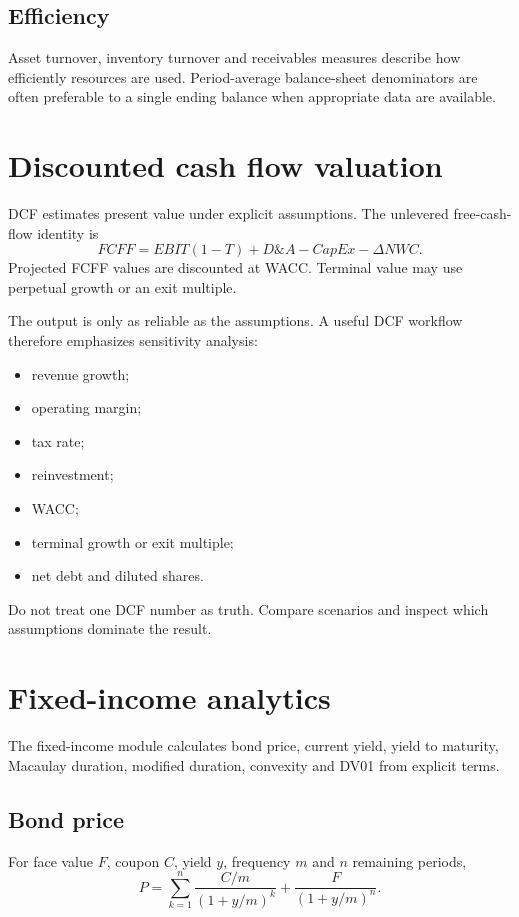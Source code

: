 \documentclass[11pt]{article}
\begin{document}
\subsection{Efficiency}
Asset turnover, inventory turnover and receivables measures describe how efficiently resources are used. Period-average balance-sheet denominators are often preferable to a single ending balance when appropriate data are available.

\section{Discounted cash flow valuation}
DCF estimates present value under explicit assumptions. The unlevered free-cash-flow identity is
\begin{equation}
FCFF=EBIT(1-T)+D\&A-CapEx-\Delta NWC.
\end{equation}
Projected FCFF values are discounted at WACC. Terminal value may use perpetual growth or an exit multiple.

The output is only as reliable as the assumptions. A useful DCF workflow therefore emphasizes sensitivity analysis:
\begin{itemize}[itemsep=0.15em]
\item revenue growth;
\item operating margin;
\item tax rate;
\item reinvestment;
\item WACC;
\item terminal growth or exit multiple;
\item net debt and diluted shares.
\end{itemize}

Do not treat one DCF number as truth. Compare scenarios and inspect which assumptions dominate the result.

\section{Fixed-income analytics}
The fixed-income module calculates bond price, current yield, yield to maturity, Macaulay duration, modified duration, convexity and DV01 from explicit terms.

\subsection{Bond price}
For face value $F$, coupon $C$, yield $y$, frequency $m$ and $n$ remaining periods,
\begin{equation}
P=\sum_{k=1}^{n}\frac{C/m}{(1+y/m)^k}+\frac{F}{(1+y/m)^n}.
\end{equation}
\end{document}
